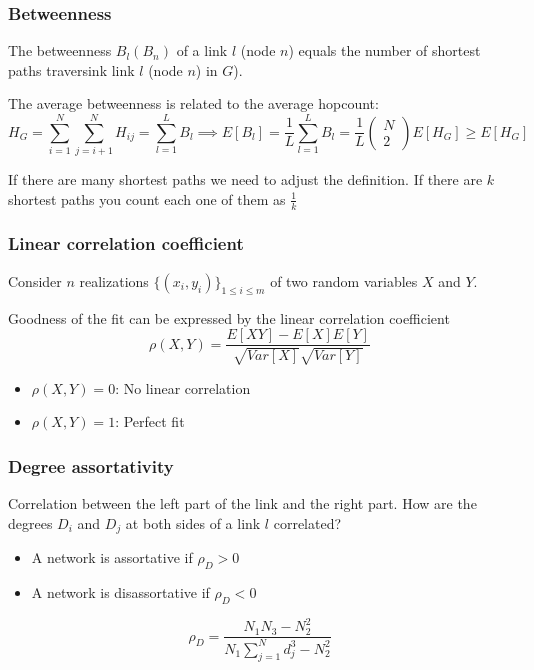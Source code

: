 \subsubsection{Betweenness}

The betweenness $B_l(B_n)$ of a link $l$ (node $n$) equals the number of shortest paths traversink
link $l$ (node $n$) in $G$).

The average betweenness is related to the average hopcount:
$$
H_G = \sum_{i = 1}^N \sum_{j = i + 1}^N H_{ij} = \sum_{l = 1}^L B_l
\implies
E[B_l] = \frac{1}{L} \sum_{l = 1}^L B_l = \frac{1}{L}
\begin{pmatrix}
  N \\ 2
\end{pmatrix}
E[H_G] \ge E[H_G]
$$

If there are many shortest paths we need to adjust the definition. If there are $k$ shortest
paths you count each one of them as $\frac{1}{k}$ 

\subsubsection{Linear correlation coefficient}
Consider $n$ realizations $\{(x_i, y_i)\}_{1 \le i\le m}$ of two random variables $X$ and $Y$.

Goodness of the fit can be expressed by the linear correlation coefficient
$$
\rho(X, Y) = \frac{E[XY] - E[X]E[Y]}{\sqrt{Var[X]}\sqrt{Var[Y]}}
$$

\begin{itemize}
  \item $\rho(X,Y) = 0$: No linear correlation
  \item $\rho(X, Y) = 1$: Perfect fit
\end{itemize}

\subsubsection{Degree assortativity}

Correlation between the left part of the link and the right part. How are the degrees $D_i$ 
and $D_j$ at both sides of a link $l$ correlated?

\begin{itemize}
  \item A network is assortative if $\rho_D > 0$
  \item A network is disassortative if $\rho_D < 0$
\end{itemize}

$$
\rho_D = \frac{N_1 N_3 - N_2^2}{N_1 \sum_{j=1}^N d_j^3 - N_2^2}
$$

